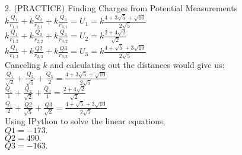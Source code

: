 \documentclass{article}
\begin{document}
{\Large 2. (PRACTICE) Finding Charges from Potential Measurements}\\[.3cm]
$k\frac{Q_1}{r_{1,1}} + k\frac{Q_2}{r_{2,1}} + k\frac{Q_3}{r_{3,1}} = U_1 = k\frac{4+3\sqrt{5}+\sqrt{10}}{2\sqrt{5}}$ \\[.3cm]
$k\frac{Q_1}{r_{1,2}} + k\frac{Q_2}{r_{2,2}} + k\frac{Q_3}{r_{3,2}} = U_2 = k\frac{2+4\sqrt{2}}{\sqrt{2}}$ \\[.3cm]
$k\frac{Q_1}{r_{1,3}} + k\frac{Q2}{r_{2,3}} + k\frac{Q3}{r_{3,3}} = U_3 = k\frac{4+\sqrt{5}+3\sqrt{10}}{2\sqrt{5}}$ \\[.3cm]
Canceling $k$ and calculating out the distances would give us:\\[.3cm]
$\frac{Q_1}{\sqrt{2}} + \frac{Q_2}{\sqrt{5}} + \frac{Q_3}{2} = \frac{4+3\sqrt{5}+\sqrt{10}}{2\sqrt{5}}$ \\[.3cm]
$\frac{Q_1}{1} + \frac{Q_2}{\sqrt{2}} + \frac{Q_3}{1} = \frac{2+4\sqrt{2}}{\sqrt{2}}$ \\[.3cm]
$\frac{Q_1}{2} + \frac{Q2}{\sqrt{5}} + \frac{Q3}{\sqrt{2}} = \frac{4+\sqrt{5}+3\sqrt{10}}{2\sqrt{5}}$ \\[.3cm]
Using IPython to solve the linear equations,\\

$Q1 = -173.$\\[.15cm]

$Q2 = 490.$ \\[.15cm]

$Q3 = -163.$ \\[.15cm]
\end{document}
